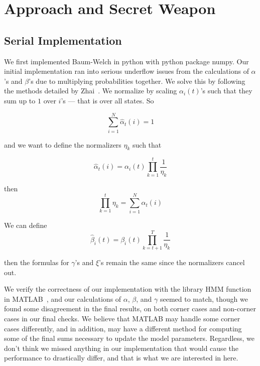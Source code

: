 \section{Approach and Secret Weapon}

\subsection{Serial Implementation}
We first implemented Baum-Welch in python with python package numpy. Our initial
implementation ran into serious underflow issues from the calculations of
$\alpha$'s and $\beta$'s due to multiplying probabilities together. We solve
this by following the methods detailed by Zhai~\cite{normalizer}. We normalize by scaling $\alpha_i(t)$'s such that they sum up to $1$ over $i$'s --- that is over all states. So 

\begin{equation} 
\sum_{i=1}^N \hat{\alpha}_t(i) = 1
\end{equation}

and we want to define the normalizers $\eta_k$ such that

\begin{equation} 
    \hat{\alpha}_t(i) = \alpha_i(t) \prod_{k=1}^t \frac{1}{\eta_k}
\end{equation}

then 
\begin{equation}
\prod_{k=1}^t \eta_k =\sum_{i=1}^N \alpha_t(i)
\end{equation}

We can define 
\begin{equation} 
    \hat{\beta}_{i}(t) = \beta_{i}(t) \prod_{k=t+1}^T \frac{1}{\eta_k}
\end{equation}

then the formulas for $\gamma$'s and $\xi$'s remain the same since the normalizers cancel out.

We verify the correctness of our implementation with the library HMM function in
MATLAB~\cite{matlab}, and our calculations of $\alpha$, $\beta$, and $\gamma$ seemed to match, though we found some disagreement in the final results, on both corner cases and non-corner cases in our final checks.  We believe that MATLAB may handle some corner cases differently, and in addition, may have a different method for computing some of the final sums necessary to update the model parameters.  Regardless, we don't think we missed anything in our implementation that would cause the performance to drastically differ, and that is what we are interested in here. 

